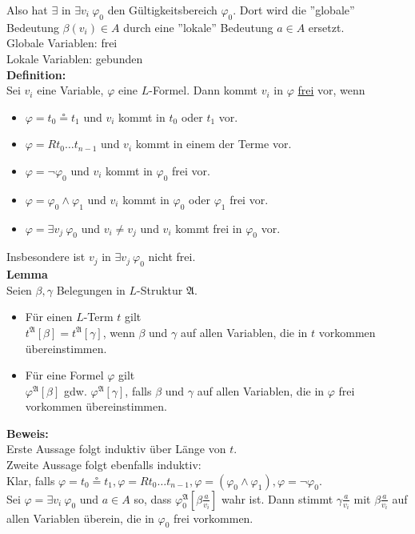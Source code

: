 \documentclass[a4paper]{scrartcl}
\newcommand{\mfa}{\mathfrak{A}}  %
\begin{document}
Also hat $\exists$ in $\exists v_i\ \varphi_0$ den Gültigkeitsbereich $\varphi_0$. Dort wird die ''globale'' Bedeutung $\beta(v_i)\in A$ durch eine ''lokale'' Bedeutung $a \in A$ ersetzt.\medskip\\
Globale Variablen: frei\\
Lokale Variablen: gebunden\medskip\\
\textbf{Definition:}\\
Sei $v_i$ eine Variable, $\varphi$ eine $L$-Formel. Dann kommt $v_i$ in $\varphi$ \underline{frei} vor, wenn
\begin{itemize}
\item $\varphi = t_0 \circeq t_1$ und $v_i$ kommt in $t_0$ oder $t_1$ vor.
\item $\varphi = Rt_0 \dots t_{n-1}$ und $v_i$ kommt in einem der Terme vor.
\item $\varphi = \lnot \varphi_0$ und $v_i$ kommt in $\varphi_0$ frei vor.
\item $\varphi = \varphi_0 \land \varphi_1$ und $v_i$ kommt in $\varphi_0$ oder $\varphi_1$ frei vor.
\item $\varphi = \exists v_j\ \varphi_0$ und $v_i \neq v_j$ und $v_i$ kommt frei in $\varphi_0$ vor.
\end{itemize}
Insbesondere ist $v_j$ in $\exists v_j\ \varphi_0$ nicht frei.\medskip\\
\textbf{Lemma}\\
Seien $\beta,\gamma$ Belegungen in $L$-Struktur $\mfa$.
\begin{itemize}
\item Für einen $L$-Term $t$ gilt\\
$t^\mfa[\beta] = t^\mfa[\gamma]$, wenn $\beta$ und $\gamma$ auf allen Variablen, die in $t$ vorkommen übereinstimmen.
\item Für eine Formel $\varphi$ gilt\\
$\varphi^\mfa[\beta]$ gdw. $\varphi^\mfa[\gamma]$, falls $\beta$ und $\gamma$ auf allen Variablen, die in $\varphi$ frei vorkommen übereinstimmen.
\end{itemize}
\textbf{Beweis:}\\
Erste Aussage folgt induktiv über Länge von $t$.\smallskip\\
Zweite Aussage folgt ebenfalls induktiv:\\
Klar, falls $\varphi = t_0 \circeq t_1,\varphi = Rt_0 \dots t_{n-1},\varphi = (\varphi_0 \land \varphi_1),\varphi = \lnot \varphi_0$.\smallskip\\
Sei $\varphi = \exists v_i\ \varphi_0$ und $a \in A$ so, dass $\varphi_0^\mfa[\beta \frac{a}{v_i}]$ wahr ist. Dann stimmt $\gamma \frac{a}{v_i}$ mit $\beta \frac{a}{v_i}$ auf allen Variablen überein, die in $\varphi_0$ frei vorkommen.\\
\end{document}

